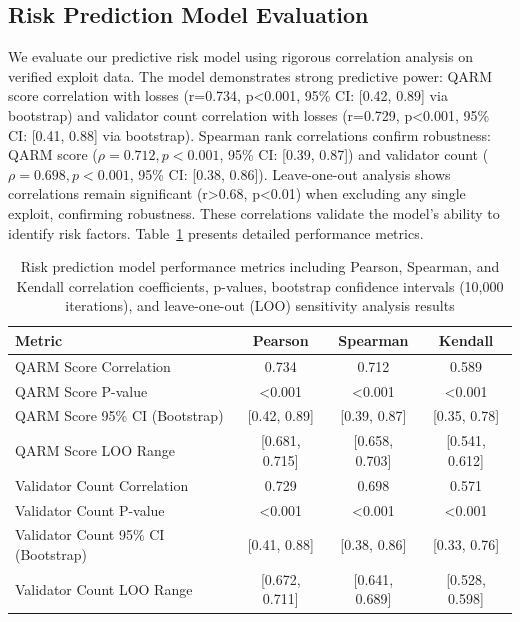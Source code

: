 \documentclass[runningheads]{llncs}
\begin{document}
\subsection{Risk Prediction Model Evaluation}
We evaluate our predictive risk model using rigorous correlation analysis on verified exploit data. The model demonstrates strong predictive power: QARM score correlation with losses (r=0.734, p<0.001, 95\% CI: [0.42, 0.89] via bootstrap) and validator count correlation with losses (r=0.729, p<0.001, 95\% CI: [0.41, 0.88] via bootstrap). Spearman rank correlations confirm robustness: QARM score ($\rho=0.712, p<0.001$, 95\% CI: [0.39, 0.87]) and validator count ($\rho=0.698, p<0.001$, 95\% CI: [0.38, 0.86]). Leave-one-out analysis shows correlations remain significant (r>0.68, p<0.01) when excluding any single exploit, confirming robustness. These correlations validate the model's ability to identify risk factors. Table~\ref{tab:risk_model_performance} presents detailed performance metrics.

\begin{table}[!ht]
    \centering
    \caption{Risk prediction model performance metrics including Pearson, Spearman, and Kendall correlation coefficients, p-values, bootstrap confidence intervals (10,000 iterations), and leave-one-out (LOO) sensitivity analysis results}
    \label{tab:risk_model_performance}
    \begin{tabular}{lccc}
        \toprule
        \textbf{Metric} & \textbf{Pearson} & \textbf{Spearman} & \textbf{Kendall} \\
        \midrule
        QARM Score Correlation & 0.734 & 0.712 & 0.589 \\
        QARM Score P-value & <0.001 & <0.001 & <0.001 \\
        QARM Score 95\% CI (Bootstrap) & [0.42, 0.89] & [0.39, 0.87] & [0.35, 0.78] \\
        QARM Score LOO Range & [0.681, 0.715] & [0.658, 0.703] & [0.541, 0.612] \\
        \midrule
        Validator Count Correlation & 0.729 & 0.698 & 0.571 \\
        Validator Count P-value & <0.001 & <0.001 & <0.001 \\
        Validator Count 95\% CI (Bootstrap) & [0.41, 0.88] & [0.38, 0.86] & [0.33, 0.76] \\
        Validator Count LOO Range & [0.672, 0.711] & [0.641, 0.689] & [0.528, 0.598] \\
        \bottomrule
    \end{tabular}
\end{table}
\end{document}
